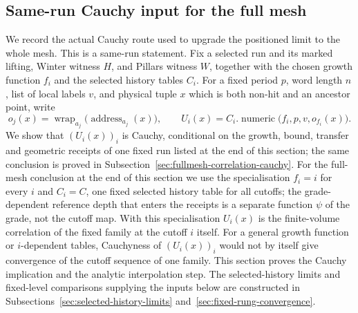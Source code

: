 \subsection{Same-run Cauchy input for the full mesh}
\label{ex-public-same-run-cauchy}

We record the actual Cauchy route used to upgrade the positioned limit to the
whole mesh. This is a same-run statement. Fix a selected run and its marked lifting,
Winter witness $H$, and Pillars witness $W$, together with the chosen growth
function $f_i$ and the selected history tables $C_i$. For a fixed period $p$,
word length $n$, list of local labels $v$, and physical tuple $x$ which is
both non-hit and an ancestor point, write
\[
 o_j(x)=\operatorname{wrap}_{a_j}\bigl(\operatorname{address}_{a_j}(x)\bigr),
 \qquad
 U_i(x)=C_i.\operatorname{numeric}\bigl(f_i,p,v,o_{f_i}(x)\bigr).
\]
We show that $(U_i(x))_i$ is Cauchy, conditional on the growth, bound,
transfer and geometric receipts of one fixed run listed at the end of this
section; the same conclusion is proved in
Subsection~\ref{sec:fullmesh-correlation-cauchy}.
For the full-mesh conclusion at the end of this section we use the
specialisation $f_i=i$ for every $i$ and $C_i=C$, one fixed selected history
table for all cutoffs; the grade-dependent reference depth that enters the
receipts is a separate function $\psi$ of the grade, not the cutoff map.
With this specialisation $U_i(x)$ is the finite-volume correlation of the
fixed family at the cutoff $i$ itself. For a general growth function or
$i$-dependent tables, Cauchyness of $(U_i(x))_i$ would not by itself give
convergence of the cutoff sequence of one family. This
section proves the Cauchy implication and the analytic interpolation step.
The selected-history limits and fixed-level comparisons supplying the
inputs below are constructed in Subsections~\ref{sec:selected-history-limits}
and~\ref{sec:fixed-rung-convergence}.

